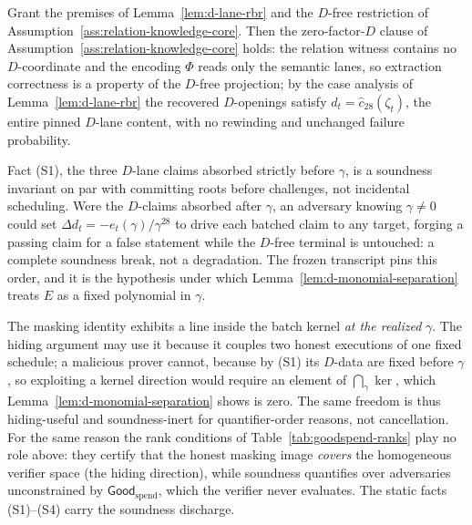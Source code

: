 \begin{lemma}
\label{lem:d-lane-knowledge}
Grant the premises of Lemma~\ref{lem:d-lane-rbr} and the \(D\)-free restriction
of Assumption~\ref{ass:relation-knowledge-core}.  Then the zero-factor-\(D\)
clause of Assumption~\ref{ass:relation-knowledge-core} holds: the relation
witness contains no \(D\)-coordinate and the encoding \(\Phi\) reads only the
semantic lanes, so extraction correctness is a property of the \(D\)-free
projection; by the case analysis of Lemma~\ref{lem:d-lane-rbr} the recovered
\(D\)-openings satisfy \(d_t=\hat c_{28}(\zeta_t)\), the entire pinned
\(D\)-lane content, with no rewinding and unchanged failure probability.
\end{lemma}

\begin{remark}
\label{rem:d-order-pin}
Fact \textup{(S1)}, the three \(D\)-lane claims absorbed strictly before
\(\gamma\), is a soundness invariant on par with committing roots before
challenges, not incidental scheduling.  Were the \(D\)-claims absorbed after
\(\gamma\), an adversary knowing \(\gamma\ne0\) could set
\(\Delta d_t=-e_t(\gamma)/\gamma^{28}\) to drive each batched claim to any
target, forging a passing claim for a false statement while the \(D\)-free
terminal is untouched: a complete soundness break, not a degradation.  The
frozen transcript pins this order, and it is the hypothesis under which
Lemma~\ref{lem:d-monomial-separation} treats \(E\) as a fixed polynomial in
\(\gamma\).
\end{remark}

\begin{remark}
\label{rem:rn-duality}
The masking identity exhibits a line inside the batch kernel \emph{at the
realized} \(\gamma\).  The hiding argument may use it because it couples two
honest executions of one fixed schedule; a malicious prover cannot, because by
\textup{(S1)} its \(D\)-data are fixed before \(\gamma\), so exploiting a kernel
direction would require an element of \(\bigcap_\gamma\ker\), which
Lemma~\ref{lem:d-monomial-separation} shows is zero.  The same freedom is thus
hiding-useful and soundness-inert for quantifier-order reasons, not
cancellation.  For the same reason the rank conditions of
Table~\ref{tab:goodspend-ranks} play no role above: they certify that the
honest masking image \emph{covers} the homogeneous verifier space (the hiding
direction), while soundness quantifies over adversaries unconstrained by
\(\mathsf{Good}_{\mathrm{spend}}\), which the verifier never evaluates.  The
static facts \textup{(S1)--(S4)} carry the soundness discharge.
\end{remark}

